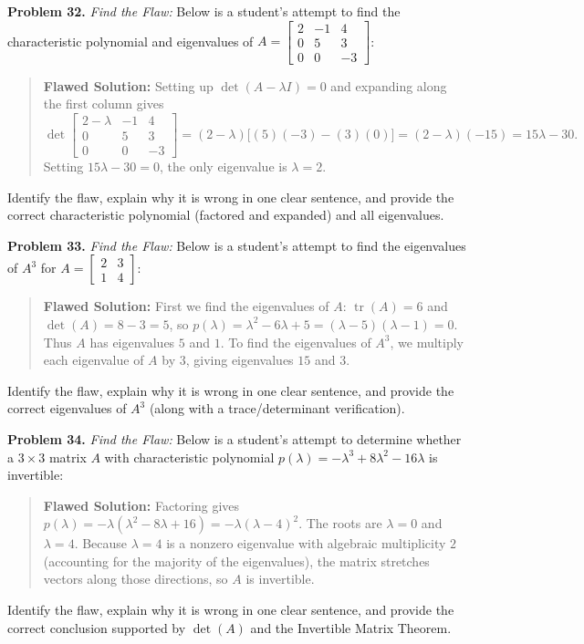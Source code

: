 \documentclass[11pt, letterpaper]{article}
\theoremstyle{definition}
\theoremstyle{remark}
\begin{document}
\noindent\textbf{Problem 32.} \textit{Find the Flaw:} Below is a student's attempt to find the characteristic polynomial and eigenvalues of $A = \begin{bmatrix} 2 & -1 & 4 \\ 0 & 5 & 3 \\ 0 & 0 & -3 \end{bmatrix}$:
\begin{quote}
\textbf{Flawed Solution:} Setting up $\det(A - \lambda I) = 0$ and expanding along the first column gives
\[
\det\begin{bmatrix} 2 - \lambda & -1 & 4 \\ 0 & 5 & 3 \\ 0 & 0 & -3 \end{bmatrix} = (2 - \lambda)\big[(5)(-3) - (3)(0)\big] = (2 - \lambda)(-15) = 15\lambda - 30.
\]
Setting $15\lambda - 30 = 0$, the only eigenvalue is $\lambda = 2$.
\end{quote}
Identify the flaw, explain why it is wrong in one clear sentence, and provide the correct characteristic polynomial (factored and expanded) and all eigenvalues.

\noindent\textbf{Problem 33.} \textit{Find the Flaw:} Below is a student's attempt to find the eigenvalues of $A^3$ for $A = \begin{bmatrix} 2 & 3 \\ 1 & 4 \end{bmatrix}$:
\begin{quote}
\textbf{Flawed Solution:} First we find the eigenvalues of $A$: $\operatorname{tr}(A) = 6$ and $\det(A) = 8 - 3 = 5$, so $p(\lambda) = \lambda^2 - 6\lambda + 5 = (\lambda - 5)(\lambda - 1) = 0$. Thus $A$ has eigenvalues $5$ and $1$. To find the eigenvalues of $A^3$, we multiply each eigenvalue of $A$ by $3$, giving eigenvalues $15$ and $3$.
\end{quote}
Identify the flaw, explain why it is wrong in one clear sentence, and provide the correct eigenvalues of $A^3$ (along with a trace/determinant verification).

\noindent\textbf{Problem 34.} \textit{Find the Flaw:} Below is a student's attempt to determine whether a $3 \times 3$ matrix $A$ with characteristic polynomial $p(\lambda) = -\lambda^3 + 8\lambda^2 - 16\lambda$ is invertible:
\begin{quote}
\textbf{Flawed Solution:} Factoring gives $p(\lambda) = -\lambda(\lambda^2 - 8\lambda + 16) = -\lambda(\lambda - 4)^2$. The roots are $\lambda = 0$ and $\lambda = 4$. Because $\lambda = 4$ is a nonzero eigenvalue with algebraic multiplicity $2$ (accounting for the majority of the eigenvalues), the matrix stretches vectors along those directions, so $A$ is invertible.
\end{quote}
Identify the flaw, explain why it is wrong in one clear sentence, and provide the correct conclusion supported by $\det(A)$ and the Invertible Matrix Theorem.
\end{document}

